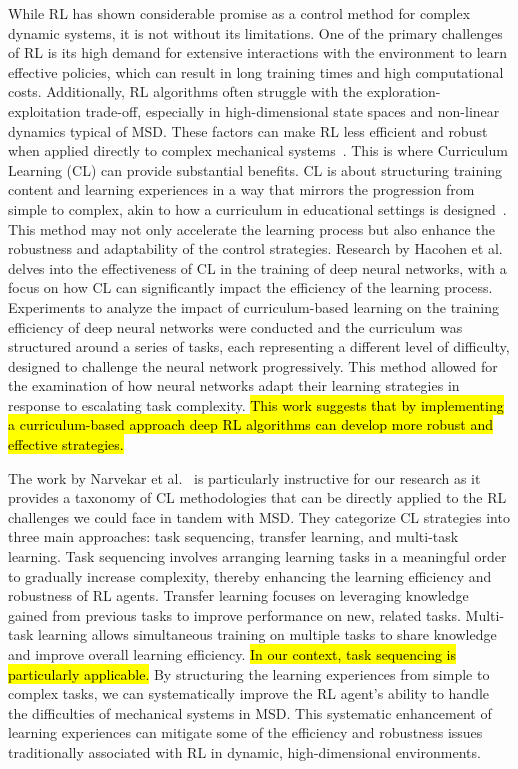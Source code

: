 While RL has shown considerable promise as a control method for complex dynamic systems, it is not without its limitations. One of the primary challenges of RL is its high demand for extensive interactions with the environment to learn effective policies, which can result in long training times and high computational costs. Additionally, RL algorithms often struggle with the exploration-exploitation trade-off, especially in high-dimensional state spaces and non-linear dynamics typical of MSD. These factors can make RL less efficient and robust when applied directly to complex mechanical systems~\cite{dulac2019challenges}.
This is where Curriculum Learning (CL) can provide substantial benefits. CL is about structuring training content and learning experiences in a way that mirrors the progression from simple to complex, akin to how a curriculum in educational settings is designed~\cite{bengio2009cl}. This method may not only accelerate the learning process but also enhance the robustness and adaptability of the control strategies.
Research by Hacohen et al.~\cite{hacohen2019clnetworks} delves into the effectiveness of CL in the training of deep neural networks, with a focus on how CL can significantly impact the efficiency of the learning process. Experiments to analyze the impact of curriculum-based learning on the training efficiency of deep neural networks were conducted and the curriculum was structured around a series of tasks, each representing a different level of difficulty, designed to challenge the neural network progressively. This method allowed for the examination of how neural networks adapt their learning strategies in response to escalating task complexity. \hl{This work suggests that by implementing a curriculum-based approach deep RL algorithms can develop more robust and effective strategies.}


The work by Narvekar et al.~\cite{narvekar2020survey} is particularly instructive for our research as it provides a taxonomy of CL methodologies that can be directly applied to the RL challenges we could face in tandem with MSD. They categorize CL strategies into three main approaches: task sequencing, transfer learning, and multi-task learning. Task sequencing involves arranging learning tasks in a meaningful order to gradually increase complexity, thereby enhancing the learning efficiency and robustness of RL agents. Transfer learning focuses on leveraging knowledge gained from previous tasks to improve performance on new, related tasks. Multi-task learning allows simultaneous training on multiple tasks to share knowledge and improve overall learning efficiency. \hl{In our context, task sequencing is particularly applicable.} By structuring the learning experiences from simple to complex tasks, we can systematically improve the RL agent's ability to handle the difficulties of mechanical systems in MSD. This systematic enhancement of learning experiences can mitigate some of the efficiency and robustness issues traditionally associated with RL in dynamic, high-dimensional environments.

